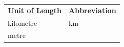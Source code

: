 {    %
    
        \begin{center}
      
      \label{m39370*uid8}
      
    \noindent
      \tablelasttail{}
      \begin{xtabular*}{\mytablewidth}[t]{|p{10\mystarwidth}|p{10\mystarwidth}|}\hline
    
    
        
                \textbf{Unit of Length}
               &
    
    
        
                \textbf{Abbreviation}
     \tabularnewline{}
    
    
        kilometre &
    
    
        km%
     \tabularnewline{}
    
    
        metre &
    

\end{xtabular*}
\end{center}}

